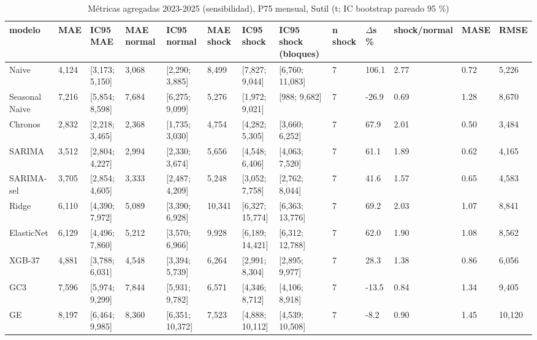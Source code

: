 \begin{table}[H]
\centering
\small
\caption{Métricas agregadas 2023-2025 (sensibilidad), P75 mensual, Sutil (t; IC bootstrap pareado 95 \%)}
\label{tab:T06_agregadas_P75_sensibilidad_2023_2025_sutil}
\begin{tabular}{lllllllllllll}
\toprule
modelo & MAE & IC95 MAE & MAE normal & IC95 normal & MAE shock & IC95 shock & IC95 shock (bloques) & n shock & $\Delta$s \% & shock/normal & MASE & RMSE \\
\midrule
Naive & 4,124 & [3,173; 5,150] & 3,068 & [2,290; 3,885] & 8,499 & [7,827; 9,044] & [6,760; 11,083] & 7 & 106.1 & 2.77 & 0.72 & 5,226 \\
Seasonal Naive & 7,216 & [5,854; 8,598] & 7,684 & [6,275; 9,099] & 5,276 & [1,972; 9,021] & [988; 9,682] & 7 & -26.9 & 0.69 & 1.28 & 8,670 \\
Chronos & 2,832 & [2,218; 3,465] & 2,368 & [1,735; 3,030] & 4,754 & [4,282; 5,305] & [3,660; 6,252] & 7 & 67.9 & 2.01 & 0.50 & 3,484 \\
SARIMA & 3,512 & [2,804; 4,227] & 2,994 & [2,330; 3,674] & 5,656 & [4,548; 6,406] & [4,063; 7,520] & 7 & 61.1 & 1.89 & 0.62 & 4,165 \\
SARIMA-sel & 3,705 & [2,854; 4,605] & 3,333 & [2,487; 4,209] & 5,248 & [3,052; 7,758] & [2,762; 8,044] & 7 & 41.6 & 1.57 & 0.65 & 4,583 \\
Ridge & 6,110 & [4,390; 7,972] & 5,089 & [3,390; 6,928] & 10,341 & [6,327; 15,774] & [6,363; 13,776] & 7 & 69.2 & 2.03 & 1.07 & 8,841 \\
ElasticNet & 6,129 & [4,496; 7,860] & 5,212 & [3,570; 6,966] & 9,928 & [6,189; 14,421] & [6,312; 12,788] & 7 & 62.0 & 1.90 & 1.08 & 8,562 \\
XGB-37 & 4,881 & [3,788; 6,031] & 4,548 & [3,394; 5,739] & 6,264 & [2,991; 8,304] & [2,895; 9,977] & 7 & 28.3 & 1.38 & 0.86 & 6,056 \\
GC3 & 7,596 & [5,974; 9,299] & 7,844 & [5,931; 9,782] & 6,571 & [4,346; 8,712] & [4,106; 8,918] & 7 & -13.5 & 0.84 & 1.34 & 9,405 \\
GE & 8,197 & [6,464; 9,985] & 8,360 & [6,351; 10,372] & 7,523 & [4,888; 10,112] & [4,539; 10,508] & 7 & -8.2 & 0.90 & 1.45 & 10,120 \\
\bottomrule
\end{tabular}
\end{table}